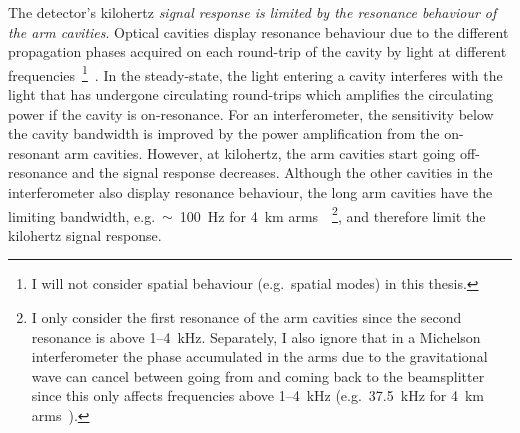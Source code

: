 The detector's kilohertz \emph{signal response is limited by the resonance behaviour of the arm cavities}.
Optical cavities display resonance behaviour due to the different propagation phases acquired on each round-trip of the cavity by light at different frequencies~\footnote{I will not consider spatial behaviour (e.g.\ spatial modes) in this thesis.}~\cite{hodgson_1997}. In the steady-state, the light entering a cavity interferes with the light that has undergone circulating round-trips which amplifies the circulating power if the cavity is on-resonance. %
For an interferometer, the sensitivity below the cavity bandwidth is improved by the power amplification from the on-resonant arm cavities. However, at kilohertz, the arm cavities start going off-resonance and the signal response decreases. %
Although the other cavities in the interferometer also display resonance behaviour, the long arm cavities have the limiting bandwidth, e.g.\ $\sim$~100~Hz for 4~km arms~\cite{AdvancedLIGO:2015}~\footnote{I only consider the first resonance of the arm cavities since the second resonance is above 1--4~kHz. Separately, I also ignore that in a Michelson interferometer the phase accumulated in the arms due to the gravitational wave can cancel between going from and coming back to the beamsplitter since this only affects frequencies above 1--4~kHz (e.g.\ 37.5~kHz for 4~km arms~\cite{AdvancedLIGO:2015,bond_2010}).}, and therefore limit the kilohertz signal response. %


